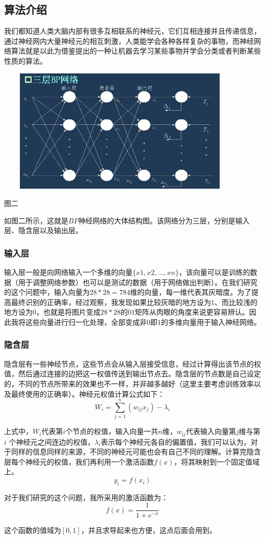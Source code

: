 ﻿\documentclass[UTF8]{ctexart}
\begin{document}
    \subsection{算法介绍}
我们都知道人类大脑内部有很多互相联系的神经元，它们互相连接并且传递信息，通过神经网内大量神经元的相互刺激，人类能学会各种各样复杂的事物，而神经网络算法就是以此为借鉴提出的一种让机器去学习某些事物并学会分类或者判断某些性质的算法。\\ \par
\centerline{\includegraphics[height=6cm,width=12cm]{p2.jpg}}
\begin{center} 图二 \end{center}\par
如图二所示，这就是$BP$神经网络的大体结构图。该网络分为三层，分别是输入层、隐含层以及输出层。\par
        \subsubsection{输入层}
输入层一般是向网络输入一个多维的向量$\{x1,x2,...,xn\}$，该向量可以是训练的数据（用于调整网络参数）也可以是测试的数据（用于网络做出判断）。在我们研究的这个问题中，输入向量为$28*28=784$维的向量，每一维代表其灰暗度。为了提高最终识别的正确率，经过观察，我发现如果比较灰暗的地方设为$1$、而比较浅的地方设为$0$，也就是将图片变成$28*28$的$01$矩阵从肉眼的角度来说更容易辨认。因此我将这些向量进行归一化处理，全部变成非$0$即$1$的多维向量用于输入神经网络。\par
        \subsubsection{隐含层}
隐含层有一些神经节点，这些节点会从输入层接受信息，经过计算得出该节点的权值，然后通过连接的边把这一权值传送到输出节点去。隐含层的节点数是自己设定的，不同的节点所带来的效果也不一样，并非越多越好（这里主要考虑训练效率以及最终使用的正确率）。神经元权值计算公式如下：
$$W_i = \sum _{j=1} ^n (w_{ij}x_j) - \lambda_i$$ \par
上式中，$W_i$代表第$i$个节点的权值，输入向量一共$n$维，$w_{ij}$代表输入向量第$j$维与第$i$ 个神经元之间连边的权值，$\lambda_i$表示每个神经元各自的偏置值，我们可以认为，对于同样的信息同样的来源，不同的神经元可能也会有自己不同的理解。计算完隐含层每个神经元的权值，我们再利用一个激活函数$f(x)$，将其映射到一个固定值域上。
$$y_i = f(x_i)$$ \par
对于我们研究的这个问题，我所采用的激活函数为：
$$f(x) = \frac{1}{1 + e^{-x}}$$ \par
这个函数的值域为$[0,1]$，并且求导起来也方便，这点后面会用到。\par
\end{document}

